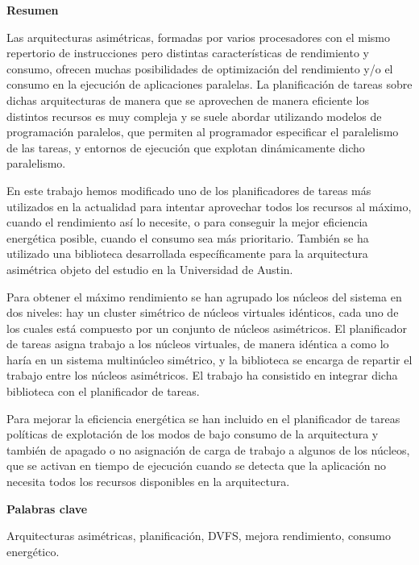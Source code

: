 
\cleardoublepage
\thispagestyle{empty}

\begin{center}
  {\bf \Huge Resumen}
\end{center}

Las arquitecturas asimétricas, formadas por varios procesadores con el
mismo repertorio de instrucciones pero distintas características de
rendimiento y consumo, ofrecen muchas posibilidades de optimización del
rendimiento y/o el consumo en la ejecución de aplicaciones paralelas. La
planificación de tareas sobre dichas arquitecturas de manera que se
aprovechen de manera eficiente los distintos recursos es muy compleja y se
suele abordar utilizando modelos de programación paralelos, que permiten al
programador especificar el paralelismo de las tareas, y entornos de
ejecución que explotan dinámicamente dicho paralelismo.

En este trabajo hemos modificado uno de los planificadores de tareas más
utilizados en la actualidad para intentar aprovechar todos los recursos al
máximo, cuando el rendimiento así lo necesite, o para conseguir la mejor
eficiencia energética posible, cuando el consumo sea más
prioritario. También se ha utilizado una biblioteca desarrollada
específicamente para la arquitectura asimétrica objeto del estudio en la
Universidad de Austin.

Para obtener el máximo rendimiento se han agrupado los núcleos del sistema
en dos niveles: hay un cluster simétrico de núcleos virtuales idénticos,
cada uno de los cuales está compuesto por un conjunto de núcleos
asimétricos. El planificador de tareas asigna trabajo a los núcleos
virtuales, de manera idéntica a como lo haría en un sistema multinúcleo
simétrico, y la biblioteca se encarga de repartir el trabajo entre los
núcleos asimétricos. El trabajo ha consistido en integrar dicha biblioteca
con el planificador de tareas.

Para mejorar la eficiencia energética se han incluido en el planificador de
tareas políticas de explotación de los modos de bajo consumo de la
arquitectura y también de apagado o no asignación de carga de trabajo a
algunos de los núcleos, que se activan en tiempo de ejecución cuando se
detecta que la aplicación no necesita todos los recursos disponibles en la
arquitectura.


\begin{center}
  {\bf \Large Palabras clave}
\end{center}
{
\parindent=0in   
Arquitecturas asimétricas, planificación, DVFS, mejora rendimiento, consumo
energético.
}



